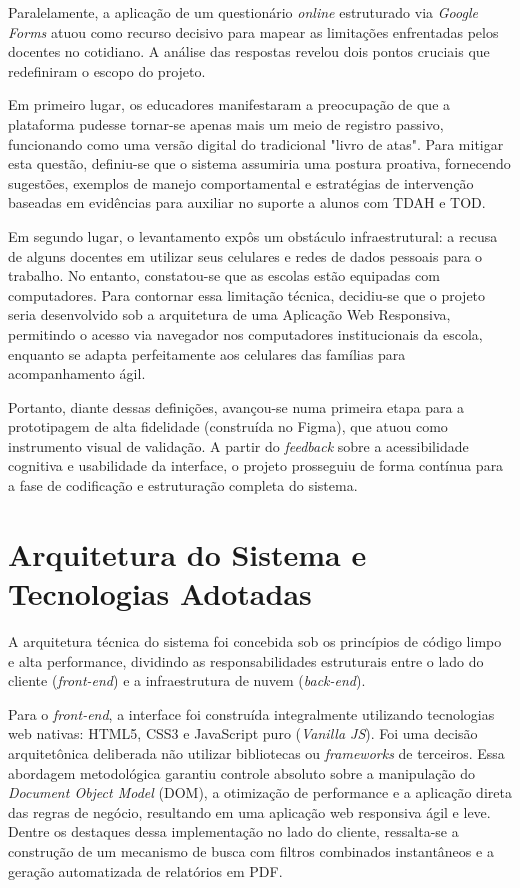 Paralelamente, a aplicação de um questionário \textit{online} estruturado via \textit{Google Forms} atuou como recurso decisivo para mapear as limitações enfrentadas pelos docentes no cotidiano. A análise das respostas revelou dois pontos cruciais que redefiniram o escopo do projeto.

Em primeiro lugar, os educadores manifestaram a preocupação de que a plataforma pudesse tornar-se apenas mais um meio de registro passivo, funcionando como uma versão digital do tradicional "livro de atas". Para mitigar esta questão, definiu-se que o sistema assumiria uma postura proativa, fornecendo sugestões, exemplos de manejo comportamental e estratégias de intervenção baseadas em evidências para auxiliar no suporte a alunos com TDAH e TOD.

Em segundo lugar, o levantamento expôs um obstáculo infraestrutural: a recusa de alguns docentes em utilizar seus celulares e redes de dados pessoais para o trabalho. No entanto, constatou-se que as escolas estão equipadas com computadores. Para contornar essa limitação técnica, decidiu-se que o projeto seria desenvolvido sob a arquitetura de uma Aplicação Web Responsiva, permitindo o acesso via navegador nos computadores institucionais da escola, enquanto se adapta perfeitamente aos celulares das famílias para acompanhamento ágil.

Portanto, diante dessas definições, avançou-se numa primeira etapa para a prototipagem de alta fidelidade (construída no Figma), que atuou como instrumento visual de validação. A partir do \textit{feedback} sobre a acessibilidade cognitiva e usabilidade da interface, o projeto prosseguiu de forma contínua para a fase de codificação e estruturação completa do sistema.

\vspace{0.5cm}
\section{Arquitetura do Sistema e Tecnologias Adotadas}

A arquitetura técnica do sistema foi concebida sob os princípios de código limpo e alta performance, dividindo as responsabilidades estruturais entre o lado do cliente (\textit{front-end}) e a infraestrutura de nuvem (\textit{back-end}).

Para o \textit{front-end}, a interface foi construída integralmente utilizando tecnologias web nativas: HTML5, CSS3 e JavaScript puro (\textit{Vanilla JS}). Foi uma decisão arquitetônica deliberada não utilizar bibliotecas ou \textit{frameworks} de terceiros. Essa abordagem metodológica garantiu controle absoluto sobre a manipulação do \textit{Document Object Model} (DOM), a otimização de performance e a aplicação direta das regras de negócio, resultando em uma aplicação web responsiva ágil e leve. Dentre os destaques dessa implementação no lado do cliente, ressalta-se a construção de um mecanismo de busca com filtros combinados instantâneos e a geração automatizada de relatórios em PDF.

